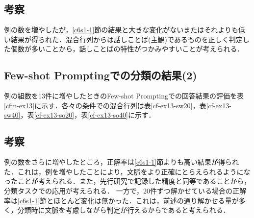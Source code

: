 \subsection{考察}
例の数を増やしたが，\ref{c6s1-1}節の結果と大きな変化がないまたはそれよりも低い結果が得られた．混合行列からは話しことば(主観)であるものを正しく判定した個数が多いことから，話しことばの特性がつかみやすいことが考えられる．

\subsection{Few-shot Promptingでの分類の結果(2) \label{c6s1-3}}
例の組数を13件に増やしたときのFew-shot Promptingでの回答結果の評価を表\ref{cfm-ex13}に示す．各々の条件での混合行列は表\ref{cf-ex13-sw20}，表\ref{cf-ex13-sw40}，表\ref{cf-ex13-so20}，表\ref{cf-ex13-so40}に示す．







\subsection{考察}
例の数をさらに増やしたところ，正解率は\ref{c6s1-1}節よりも高い結果が得られた．これは，例を増やしたことにより，文脈をより正確にとらえられるようになったことが考えられる．また，先行研究\cite{ai-checker}で記録した精度と同等であることから，分類タスクでの応用が考えられる．
一方で，20件ずつ解かせている場合の正解率は\ref{c6s1-1}節とほとんど変化は無かった．これは，前述の通り解かせる量が多く，分類時に文脈を考慮しながら判定が行えるからであると考えられる．

